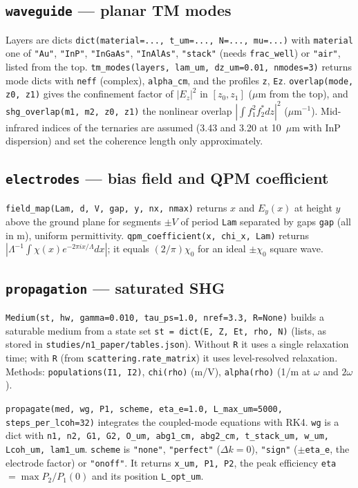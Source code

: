 \documentclass[11pt]{article}
\newcommand{\code}[1]{\texttt{#1}}
\begin{document}
\subsection{\code{waveguide} --- planar TM modes}
Layers are dicts \code{dict(material=..., t\_um=..., N=..., mu=...)} with \code{material} one of \code{"Au"}, \code{"InP"}, \code{"InGaAs"}, \code{"InAlAs"}, \code{"stack"} (needs \code{frac\_well}) or \code{"air"}, listed from the top. \code{tm\_modes(layers, lam\_um, dz\_um=0.01, nmodes=3)} returns mode dicts with \code{neff} (complex), \code{alpha\_cm}, and the profiles \code{z}, \code{Ez}. \code{overlap(mode, z0, z1)} gives the confinement factor of $|E_z|^2$ in $[z_0,z_1]$ ($\mu$m from the top), and \code{shg\_overlap(m1, m2, z0, z1)} the nonlinear overlap $|\!\int f_1^2f_2^*dz|^2$ ($\mu$m$^{-1}$). Mid-infrared indices of the ternaries are assumed (3.43 and 3.20 at 10~$\mu$m with InP dispersion) and set the coherence length only approximately.

\subsection{\code{electrodes} --- bias field and QPM coefficient}
\code{field\_map(Lam, d, V, gap, y, nx, nmax)} returns $x$ and $E_y(x)$ at height $y$ above the ground plane for segments $\pm V$ of period \code{Lam} separated by gaps \code{gap} (all in m), uniform permittivity. \code{qpm\_coefficient(x, chi\_x, Lam)} returns $|\Lambda^{-1}\!\int\chi(x)e^{-2\pi ix/\Lambda}dx|$; it equals $(2/\pi)\chi_0$ for an ideal $\pm\chi_0$ square wave.

\subsection{\code{propagation} --- saturated SHG}
\code{Medium(st, hw, gamma=0.010, tau\_ps=1.0, nref=3.3, R=None)} builds a saturable medium from a state set \code{st = dict(E, Z, Et, rho, N)} (lists, as stored in \code{studies/n1\_paper/tables.json}). Without \code{R} it uses a single relaxation time; with \code{R} (from \code{scattering.rate\_matrix}) it uses level-resolved relaxation. Methods: \code{populations(I1, I2)}, \code{chi(rho)} (m/V), \code{alpha(rho)} (1/m at $\omega$ and $2\omega$).

\code{propagate(med, wg, P1, scheme, eta\_e=1.0, L\_max\_um=5000, steps\_per\_lcoh=32)} integrates the coupled-mode equations with RK4. \code{wg} is a dict with \code{n1, n2, G1, G2, O\_um, abg1\_cm, abg2\_cm, t\_stack\_um, w\_um, Lcoh\_um, lam1\_um}. \code{scheme} is \code{"none"}, \code{"perfect"} ($\Delta k=0$), \code{"sign"} ($\pm$\code{eta\_e}, the electrode factor) or \code{"onoff"}. It returns \code{x\_um, P1, P2}, the peak efficiency \code{eta} $=\max P_2/P_1(0)$ and its position \code{L\_opt\_um}.
\end{document}
